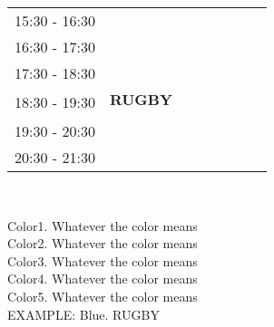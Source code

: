 \documentclass[10pt,spanish, landscape, twocolumn]{article}
\begin{document}
\begin{tabular}{|c|c|c|c|c|c|c|c|}
\hline
\hline
\multirow{2}{*}{15:30 - 16:30} & \textbf{} & \textbf{} & \textbf{} & \textbf{} & \textbf{} & \textbf{} & \textbf{} \\
& {\footnotesize } & {\footnotesize } & {\footnotesize } & {\footnotesize} & {\footnotesize} & {\footnotesize} & {\footnotesize} \\
\hline
\multirow{2}{*}{16:30 - 17:30} & \textbf{} & \textbf{} & \textbf{} & \textbf{} & \textbf{} & \textbf{} & \textbf{} \\
& {\footnotesize } & {\footnotesize } & {\footnotesize } & {\footnotesize} & {\footnotesize} & {\footnotesize} & {\footnotesize} \\
\hline
\multirow{2}{*}{17:30 - 18:30} & \textbf{} & \textbf{} & \textbf{} & \textbf{} & \textbf{} & \textbf{} & \textbf{} \\
& {\footnotesize } & {\footnotesize } & {\footnotesize } & {\footnotesize} & {\footnotesize} & {\footnotesize} & {\footnotesize} \\
\hline
\multirow{2}{*}{18:30 - 19:30} & \cellcolor{blue} \textbf{RUGBY} & \textbf{} & \textbf{} & \textbf{} & \textbf{} & \textbf{} & \textbf{} \\
& \cellcolor{blue} {\footnotesize } & {\footnotesize } & {\footnotesize } & {\footnotesize} & {\footnotesize} & {\footnotesize} & {\footnotesize} \\
\hline
\multirow{2}{*}{19:30 - 20:30}& \textbf{} & \textbf{} & \textbf{} & \textbf{} & \textbf{} & \textbf{} & \textbf{} \\
& {\footnotesize } & {\footnotesize } & {\footnotesize } & {\footnotesize} & {\footnotesize} & {\footnotesize} & {\footnotesize} \\
\hline
\multirow{2}{*}{20:30 - 21:30}& \textbf{} & \textbf{} & \textbf{} & \textbf{} & \textbf{} & \textbf{} & \textbf{} \\
& {\footnotesize } & {\footnotesize } & {\footnotesize } & {\footnotesize} & {\footnotesize} & {\footnotesize} & {\footnotesize} \\
\hline
\end{tabular}
\\[4.90cm]

\begin{flushright}
	Color1. Whatever the color means \\[0.5cm]
	
	Color2. Whatever the color means \\[0.5cm]
	
	Color3. Whatever the color means \\[0.5cm]
	
	Color4. Whatever the color means \\[0.5cm]
	
	Color5. Whatever the color means \\[0.5cm]
	
	EXAMPLE: Blue. RUGBY
	
\end{flushright}
\end{document}
